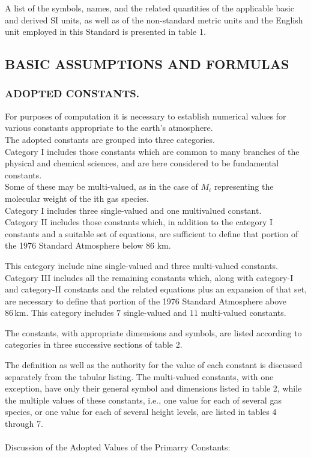 \documentclass{article}
\begin{document}
A list of the symbols, names, and the related quantities of the applicable basic and derived SI units, as well as of the non-standard metric units and the English unit employed in this Standard is presented in table 1.\\

\subsection{BASIC ASSUMPTIONS AND FORMULAS}
\subsubsection{ADOPTED CONSTANTS.}

For purposes of computation it is necessary to establish numerical values for various constants appropriate to the earth's atmosphere.\\
The adopted constants are grouped into three categories.\\

Category I includes those constants which are common to many branches of the physical and chemical sciences, and are here considered to be fundamental constants.\\
Some of these may be multi-valued, as in the case of $M_i$ representing the molecular weight of the ith gas species.\\
Category I includes three single-valued and one multivalued constant.\\

Category II includes those constants which, in addition to the category I constants and a suitable set of equations, are sufficient to define that portion of the 1976 Standard Atmosphere below 86 km.

This category include nine single-valued and three multi-valued constants. Category III includes all the remaining constants which, along with category-I and category-II constants and the related equations plus an expansion of that set, are necessary to define that portion of the 1976 Standard Atmosphere above $86 \, \text{km}$. This category includes $7$ single-valued and $11$ multi-valued constants.

The constants, with appropriate dimensions and symbols, are listed according to categories in three successive sections of table 2.

The definition as well as the authority for the value of each constant is discussed separately from the tabular listing. The multi-valued constants, with one exception, have only their general symbol and dimensions listed in table 2, while the multiple values of these constants, i.e., one value for each of several gas species, or one value for each of several height levels, are listed in tables 4 through 7.
\\\\
Discussion of the Adopted Values of the Primarry Constants:
\\\\
\end{document}

